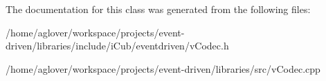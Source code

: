 The documentation for this class was generated from the following files\+:\begin{DoxyCompactItemize}
\item 
/home/aglover/workspace/projects/event-\/driven/libraries/include/i\+Cub/eventdriven/v\+Codec.\+h\item 
/home/aglover/workspace/projects/event-\/driven/libraries/src/v\+Codec.\+cpp\end{DoxyCompactItemize}
